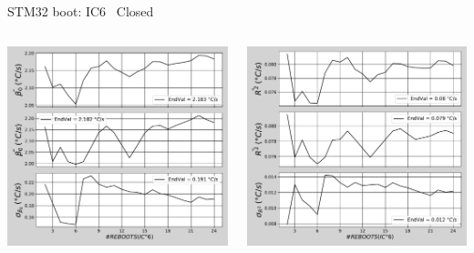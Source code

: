 \begin{frame}{STM32 boot: IC6 \textrightarrow\ Closed}
	\vspace{5mm}
	\begin{columns}
		\begin{column}{0.5\textwidth}
			\includegraphics[width=1.0\textwidth]{./figures/flistCircuit6_25_sl30beta0.pdf}
		\end{column}
		\begin{column}{0.5\textwidth}
			\includegraphics[width=1.0\textwidth]{./figures/flistCircuit6_25_sl30r2.pdf}
		\end{column}
	\end{columns}
\end{frame}

